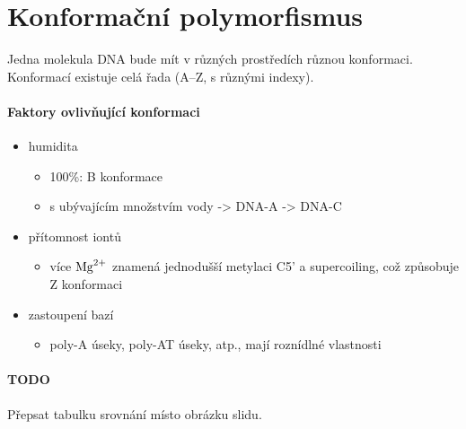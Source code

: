 \documentclass[DIV=8]{scrreprt}
\newcommand{\mybox}[2]{
    \paragraph{#1} #2
}
\begin{document}
\section{Konformační polymorfismus} \label{Konformační polymorfismus}


Jedna molekula DNA bude mít v různých prostředích různou konformaci. Konformací existuje celá řada (A--Z, s různými indexy).

\paragraph{Faktory ovlivňující konformaci}
\begin{itemize}[nosep]
    \item humidita
\begin{itemize}[nosep]
    \item 100\%: B konformace
    \item s ubývajícím množstvím vody -> DNA-A -> DNA-C
\end{itemize}

    \item přítomnost iontů
\begin{itemize}[nosep]
    \item více \(\ce{Mg^{2+}}\) znamená jednodušší metylaci C5' a supercoiling, což způsobuje Z konformaci
\end{itemize}

    \item zastoupení bazí
\begin{itemize}[nosep]
    \item poly-A úseky, poly-AT úseky, atp., mají roznídlné vlastnosti
\end{itemize}

\end{itemize}



\mybox{TODO}{Přepsat tabulku srovnání místo obrázku slidu.}
\end{document}

